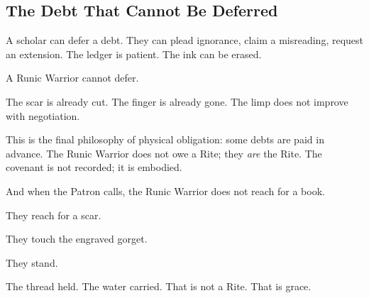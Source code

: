 \subsection{The Debt That Cannot Be Deferred}

A scholar can defer a debt. They can plead ignorance, claim a misreading, request an extension. The ledger is patient. The ink can be erased.

A Runic Warrior cannot defer.

The scar is already cut. The finger is already gone. The limp does not improve with negotiation.

This is the final philosophy of physical obligation: some debts are paid in advance. The Runic Warrior does not owe a Rite; they \textit{are} the Rite. The covenant is not recorded; it is embodied.

And when the Patron calls, the Runic Warrior does not reach for a book.

They reach for a scar.

They touch the engraved gorget.

They stand.

The thread held. The water carried. That is not a Rite. That is grace.
